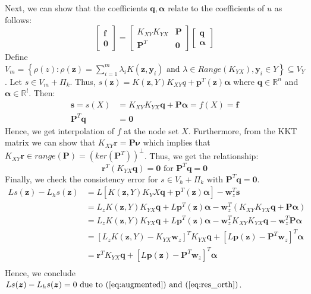 \documentclass[11pt]{article}
\begin{document}
Next, we can show that the coefficients $\bm{q}, \bm{\alpha}$ relate to the coefficients of $u$ as follows:
\begin{equation*}
	\begin{bmatrix}
		\bm{f} \\ \bm{0}
	\end{bmatrix} = 
	\begin{bmatrix}
		K_{XY} K_{YX} & \bm{P} \\
		\bm{P}^T & \bm{0}
	\end{bmatrix}
	\begin{bmatrix}
		\bm{q} \\ \bm{\alpha}
	\end{bmatrix}
\end{equation*}
Define $V_m = \left\{ \rho(z) : \rho(\bm{z}) = \sum_{i=1}^m \lambda_i K(\bm{z},\bm{y}_i) \text{ and } \lambda \in Range\left(K_{YX} \right), \bm{y}_i \in Y \right\} \subseteq V_Y$. Let $s \in V_m + \Pi_k$. Thus, $s(\bm{z}) = K(\bm{z},Y)K_{XY} q + \bm{p}^T(\bm{z}) \bm{\alpha}$ where $\bm{q} \in \mathbb{R}^{n}$ and $\bm{\alpha} \in \mathbb{R}^{l}$. Then:
\begin{align*}
	\bm{s} = s(X) &= K_{XY} K_{YX} \bm{q} + \bm{P} \bm{\alpha} = f(X) = \bm{f}\\
	\bm{P}^T \bm{q} &= \bm{0}
\end{align*}
Hence, we get interpolation of $f$ at the node set $X$. Furthermore, from the KKT matrix we can show that $K_{XY} \bm{r} = \bm{P} \bm{\nu}$ which implies that $K_{XY} \bm{r} \in range(\bm{P}) = \left( ker \left(\bm{P}^T \right) \right)^\perp$. Thus, we get the relationship:
\begin{equation}
\bm{r}^T \left( K_{YX} \bm{q} \right)=\bm{0} \text{ for } \bm{P}^T \bm{q} = \bm{0} \label{eq:res_orth}
\end{equation}
Finally, we check the consistency error for $s \in V_h+\Pi_k$ with $\bm{P}^T \bm{q}=\bm{0}$.
\begin{align*}
	Ls(\bm{z})-L_hs(\bm{z}) &= L\left[K(\bm{z},Y)K_YX \bm{q} + \bm{p}^T(\bm{z}) \bm{\alpha}\right] - \bm{w}^T_z\bm{s}\\
	&= L_z K(\bm{z},Y)K_{YX} \bm{q} + L\bm{p}^T(\bm{z}) \bm{\alpha} - \bm{w}^T_z(K_{XY} K_{YX} \bm{q} + \bm{P} \bm{\alpha})\\
	&= L_z K(\bm{z},Y)K_{YX} \bm{q} + L\bm{p}^T(\bm{z}) \bm{\alpha} - \bm{w}^T_z K_{XY} K_{YX} \bm{q} - \bm{w}^T_z \bm{P} \bm{\alpha}\\
	&= \left[ L_z K(\bm{z},Y) - K_{YX} \bm{w}_z \right]^T K_{YX} \bm{q} + \left[ L\bm{p}(\bm{z}) - \bm{P}^T \bm{w}_z \right]^T \bm{\alpha}\\
	&= \bm{r}^T K_{YX} \bm{q} + \left[ L\bm{p}(\bm{z}) - \bm{P}^T \bm{w}_z \right]^T \bm{\alpha}\\
\end{align*}
Hence, we conclude $Ls(\bm{z})-L_hs(\bm{z}) = 0 \text{ due to (\ref{eq:augmented}) and (\ref{eq:res_orth}}) \label{eq:repro}$.
\end{document}
